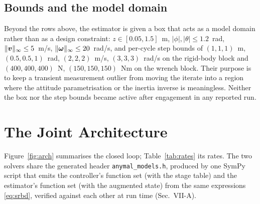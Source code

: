\documentclass[11pt]{article}
\begin{document}
\subsection{Bounds and the model domain}
Beyond the rows above, the estimator is given a box that acts as a model domain rather than as a design constraint: $z\in[0.05,1.5]$~m, $|\phi|,|\theta|\le1.2$~rad, $\|\bm{v}\|_\infty\le5$~m/s, $\|\bm{\omega}\|_\infty\le20$~rad/s, and per-cycle step bounds of $(1,1,1)$~m, $(0.5,0.5,1)$~rad, $(2,2,2)$~m/s, $(3,3,3)$~rad/s on the rigid-body block and $(400,400,400)$~N, $(150,150,150)$~Nm on the wrench block. Their purpose is to keep a transient measurement outlier from moving the iterate into a region where the attitude parametrisation or the inertia inverse is meaningless. Neither the box nor the step bounds became active after engagement in any reported run.
\section{The Joint Architecture}
Figure~\ref{fig:arch} summarises the closed loop; Table~\ref{tab:rates} its rates. The two solvers share the generated header \texttt{anymal\_models.h}, produced by one SymPy script that emits the controller's function set (with the stage table) and the estimator's function set (with the augmented state) from the same expressions \eqref{eq:srbd}, verified against each other at run time (Sec.~VII-A).
\end{document}
